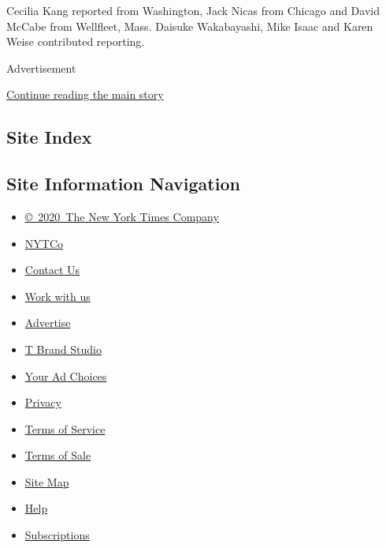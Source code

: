 Cecilia Kang reported from Washington, Jack Nicas from Chicago and David
McCabe from Wellfleet, Mass. Daisuke Wakabayashi, Mike Isaac and Karen
Weise contributed reporting.

Advertisement

\protect\hyperlink{after-bottom}{Continue reading the main story}

\hypertarget{site-index}{%
\subsection{Site Index}\label{site-index}}

\hypertarget{site-information-navigation}{%
\subsection{Site Information
Navigation}\label{site-information-navigation}}

\begin{itemize}
\tightlist
\item
  \href{https://help.nytimes.com/hc/en-us/articles/115014792127-Copyright-notice}{©~2020~The
  New York Times Company}
\end{itemize}

\begin{itemize}
\tightlist
\item
  \href{https://www.nytco.com/}{NYTCo}
\item
  \href{https://help.nytimes.com/hc/en-us/articles/115015385887-Contact-Us}{Contact
  Us}
\item
  \href{https://www.nytco.com/careers/}{Work with us}
\item
  \href{https://nytmediakit.com/}{Advertise}
\item
  \href{http://www.tbrandstudio.com/}{T Brand Studio}
\item
  \href{https://www.nytimes.com/privacy/cookie-policy\#how-do-i-manage-trackers}{Your
  Ad Choices}
\item
  \href{https://www.nytimes.com/privacy}{Privacy}
\item
  \href{https://help.nytimes.com/hc/en-us/articles/115014893428-Terms-of-service}{Terms
  of Service}
\item
  \href{https://help.nytimes.com/hc/en-us/articles/115014893968-Terms-of-sale}{Terms
  of Sale}
\item
  \href{https://spiderbites.nytimes.com}{Site Map}
\item
  \href{https://help.nytimes.com/hc/en-us}{Help}
\item
  \href{https://www.nytimes.com/subscription?campaignId=37WXW}{Subscriptions}
\end{itemize}
